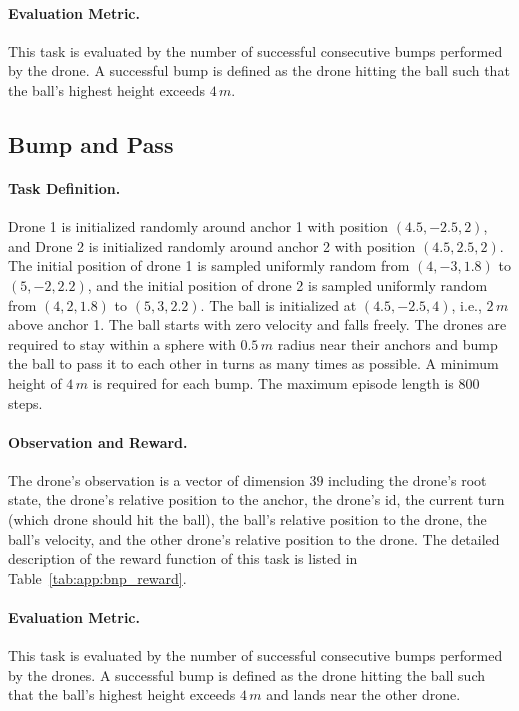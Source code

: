 \paragraph{Evaluation Metric.}
This task is evaluated by the number of successful consecutive bumps performed by the drone. A successful bump is defined as the drone hitting the ball such that the ball’s highest height exceeds $4\,m$.

\subsection{Bump and Pass}

\paragraph{Task Definition.}
Drone 1 is initialized randomly around anchor 1 with position $(4.5, -2.5, 2)$, and Drone 2 is initialized randomly around anchor 2 with position $(4.5, 2.5, 2)$. The initial position of drone 1 is sampled uniformly random from $(4, -3, 1.8)$ to $(5, -2, 2.2)$, and the initial position of drone 2 is sampled uniformly random from $(4, 2, 1.8)$ to $(5, 3, 2.2)$. The ball is initialized at $(4.5, -2.5, 4)$, i.e., $2\,m$ above anchor 1. The ball starts with zero velocity and falls freely. The drones are required to stay within a sphere with $0.5\,m$ radius near their anchors and bump the ball to pass it to each other in turns as many times as possible. A minimum height of $4\,m$ is required for each bump. The maximum episode length is 800 steps.

\paragraph{Observation and Reward.}
The drone's observation is a vector of dimension $39$ including the drone's root state, the drone's relative position to the anchor, the drone's id, the current turn (which drone should hit the ball), the ball's relative position to the drone, the ball's velocity, and the other drone's relative position to the drone. The detailed description of the reward function of this task is listed in Table~\ref{tab:app:bnp_reward}.

\paragraph{Evaluation Metric.}
This task is evaluated by the number of successful consecutive bumps performed by the drones. A successful bump is defined as the drone hitting the ball such that the ball’s highest height exceeds  $4\,m$ and lands near the other drone.

